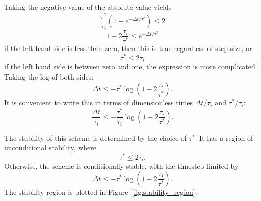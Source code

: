 \documentclass[preprint,12pt,authoryear]{elsarticle}
\begin{document}
Taking the negative value of the absolute value yields
\begin{equation}
  \frac{\tau^*}{\tau_i} \left(1-e^{-\Delta t/\tau^*} \right)  \le 2
\end{equation}
\begin{equation}
 1 - 2 \frac{\tau_i}{\tau^*} \le e^{-\Delta t/\tau^*}
\end{equation}
if the left hand side is less than zero, then this is true regardless of step size, or
\begin{equation}
\tau^* \le 2 \tau_i
\end{equation}
if the left hand side is between zero and one, the expression is more complicated. 
Taking the log of both sides:
\begin{equation}
\Delta t \le -\tau^* \log \left(1 - 2 \frac{\tau_i}{\tau^*} \right).
\end{equation}
It is convenient to write this in terms of dimensionless times $\Delta t/ \tau_i$ and $\tau^*/\tau_i$:
\begin{equation}
\frac{\Delta t}{\tau_i} \le -\frac{\tau^*}{\tau_i} \log \left(1 - 2 \frac{\tau_i}{\tau^*} \right).
\end{equation}

\fi

The stability of this scheme is determined by the choice of $\tau^*$.  
It has a region of unconditional stability, where
\begin{equation}
\tau^* \le 2 \tau_i.
\label{eq:nsfd_unconditional}
\end{equation}
Otherwise, the scheme is conditionally stable, with the timestep limited by 
\begin{equation}
\Delta t \le -\tau^* \log \left(1 - 2 \frac{\tau_i}{\tau^*} \right).
\label{eq:nsfd_conditional}
\end{equation}
The stability region is plotted in Figure~\ref{fig:stability_region}. 
\end{document}
